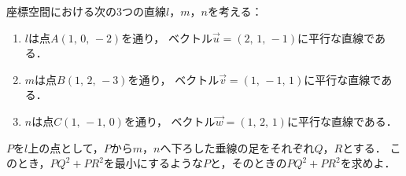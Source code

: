 \documentclass[../../main.tex]{subfiles}
\begin{document}
座標空間における次の3つの直線$l$，$m$，$n$を考える：
\begin{enumerate}
  \item []$l$は点$A(1, \, 0, \, -2)$を通り，
    ベクトル$\vec{u}=(2, \, 1, \, -1)$に平行な直線である．
  \item []$m$は点$B(1, \, 2, \, -3)$を通り，
    ベクトル$\vec{v}=(1, \, -1, \, 1)$に平行な直線である．
  \item []$n$は点$C(1, \, -1, \, 0)$を通り，
    ベクトル$\vec{w}=(1, \, 2, \, 1)$に平行な直線である．
\end{enumerate}
$P$を$l$上の点として，$P$から$m$，$n$へ下ろした垂線の足をそれぞれ$Q$，$R$とする．
このとき，${PQ}^2+{PR}^2$を最小にするような$P$と，そのときの${PQ}^2+{PR}^2$を求めよ．
\end{document}
